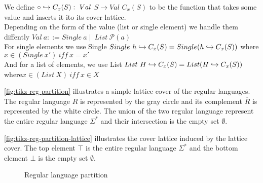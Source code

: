\begin{definition}
    We define $\circ \into C_x(S): \ Val$ $S \rightarrow Val$ $C_x(S)$ to be the function that takes some value and inserts it ito its cover lattice. \\
    Depending on the form of the value (list or single element) we handle them diffently $Val \ a ::= Single \ a \mid \ List \ \mathcal{P}(a)$ \\
    For single elements we use Single $Single \ h \hookrightarrow C_x(S) = Single(h\hookrightarrow C_x(S))$ where $x \in (Single \ x') \ iff \ x = x'$ \\
    And for a list of elements, we use List $List \ H \hookrightarrow C_x(S)=List(H\hookrightarrow C_x(S))$ where$x \in (List \ X) \ iff \ x \in X$ \\
\end{definition}


\begin{example}
    \autoref{fig:tikz-reg-partition} illustrates a simple lattice cover of the regular languages. The regular language $R$ is represented by the gray circle and its complement $\overline{R}$ is represented by the white circle. The union of the two regular language represent the entire regular language $\Sigma^*$ and their intersection is the empty set $\emptyset$.

    \autoref{fig:tikz-reg-partition-lattice} illustrates the cover lattice induced by the lattice cover. The top element $\top$ is the entire regular language $\Sigma^*$ and the bottom element $\bot$ is the empty set $\emptyset$.
\end{example}

\begin{figure}
    \center
    \caption{Regular language partition}
    \label{fig:tikz-reg-partition}
\end{figure}


